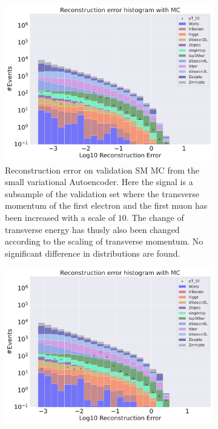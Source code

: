 \begin{figure}[h!]
    \centering
    \begin{subfigure}{.45\textwidth}
        \includegraphics[width=\textwidth]{Figures/AE_testing/small/b_data_recon_big_rm3_feats_sig_pT_10.pdf}
        \caption{Reconstruction error on validation SM MC from the small variational Autoencoder. Here the signal is a subsample of the validation 
        set where the transverse momentum of the first electron and the first muon has been increased with a scale of $10$. The change of transverse 
        energy has thusly also been changed according to the scaling of transverse momentum. No significant difference in distributions are found. }
        \label{fig:ae_small_pt_10}
    \end{subfigure}
    \hfill 
    \begin{subfigure}{.45\textwidth}
        \includegraphics[width=\textwidth]{Figures/AE_testing/big/b_data_recon_big_rm3_feats_sig_pT_10.pdf}

\end{subfigure}
\end{figure}
